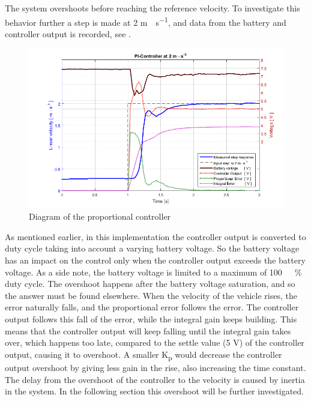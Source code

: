 %
The system overshoots before reaching the reference velocity. To investigate this behavior further a step is made at 2 \si{m\cdot s^{-1}}, and data from the battery and controller output is recorded, see .
%
\begin{figure}[H]
 	\centering
 	\includegraphics[width=.8\textwidth]{figures/PInoAntiWindup}
 	\caption{Diagram of the proportional controller}
 	\label{fig:PInoAntiWindup}
\end{figure}
%
As mentioned earlier, in this implementation the controller output is converted to duty cycle taking into account a varying battery voltage. So the battery voltage has an impact on the control only when the controller output exceeds the battery voltage. As a side note, the battery voltage is limited to a maximum of \si{100 \ \%} duty cycle.
The overshoot happens after the battery voltage saturation, and so the answer must be found elsewhere.
When the velocity of the vehicle rises, the error naturally falls, and the proportional error follows the error. The controller output follows this fall of the error, while the integral gain keeps building. This means that the controller output will keep falling until the integral gain takes over, which happens too late, compared to the settle value (5 V) of the controller output, causing it to overshoot. A smaller \si{K_p} would decrease the controller output overshoot by giving less gain in the rise, also increasing the time constant.
The delay from the overshoot of the controller to the velocity is caused by inertia in the system.
In the following section this overshoot will be further investigated.
%
